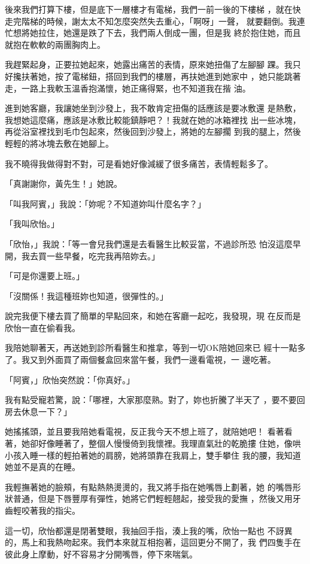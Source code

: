 後來我們打算下樓，但是底下一層樓才有電梯，我們一前一後的下樓梯
，就在快走完階梯的時候，謝太太不知怎麼突然失去重心，「啊呀」一聲，
就要翻倒。我連忙想將她拉住，她還是跌了下去，我們兩人倒成一團，但是我
終於抱住她，而且就抱在軟軟的兩團胸肉上。

我趕緊起身，正要拉她起來，她露出痛苦的表情，原來她扭傷了左腳腳
踝。我只好攙扶著她，按了電梯鈕，搭回到我們的樓層，再扶她進到她家中
，她只能跳著走，一路上我軟玉溫香抱滿懷，她正痛得緊，也不知道我在揩
油。

進到她客廳，我讓她坐到沙發上，我不敢肯定扭傷的話應該是要冰敷還
是熱敷，我想她這麼痛，應該是冰敷比較能鎮靜吧？！我就在她的冰箱裡找
出一些冰塊，再從浴室裡找到毛巾包起來，然後回到沙發上，將她的左腳擱
到我的腿上，然後輕輕的將冰塊去敷在她腳上。

我不曉得我做得對不對，可是看她好像減緩了很多痛苦，表情輕鬆多了。

「真謝謝你，黃先生！」她說。

「叫我阿賓，」我說：「妳呢？不知道妳叫什麼名字？」

「我叫欣怡。」

「欣怡，」我說：「等一會兒我們還是去看醫生比較妥當，不過診所恐
怕沒這麼早開，我去買一些早餐，吃完我再陪妳去。」

「可是你還要上班。」

「沒關係！我這種班妳也知道，很彈性的。」

說完我便下樓去買了簡單的早點回來，和她在客廳一起吃，我發現，現
在反而是欣怡一直在偷看我。

我陪她聊著天，再送她到診所看醫生和推拿，等到一切OK陪她回來已
經十一點多了。我又到外面買了兩個餐盒回來當午餐，我們一邊看電視，一
邊吃著。

「阿賓，」欣怡突然說：「你真好。」

我有點受寵若驚，說：「哪裡，大家那麼熟。對了，妳也折騰了半天了
，要不要回房去休息一下？」

她搖搖頭，並且要我陪她看電視，反正我今天不想上班了，就陪她吧！
看著看著，她卻好像睡著了，整個人慢慢倚到我懷裡。我理直氣壯的乾脆摟
住她，像哄小孩入睡一樣的輕拍著她的肩膀，她將頭靠在我肩上，雙手攀住
我的腰，我知道她並不是真的在睡。

我輕撫著她的臉頰，有點熱熱燙燙的，我又將手指在她嘴唇上劃著，她
的嘴唇形狀普通，但是下唇豐厚有彈性，她將它們輕輕翹起，接受我的愛撫
，然後又用牙齒輕咬著我的指尖。

這一切，欣怡都還是閉著雙眼，我抽回手指，湊上我的嘴，欣怡一點也
不訝異的，馬上和我熱吻起來。我們本來就互相抱著，這回更分不開了，我
們四隻手在彼此身上摩動，好不容易才分開嘴唇，停下來喘氣。

